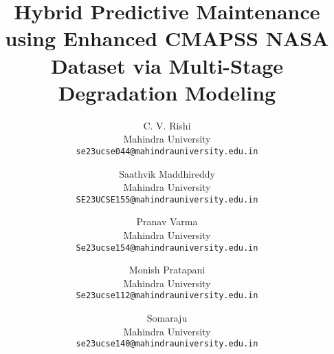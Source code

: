 \documentclass[10pt,twocolumn,letterpaper]{article}
\title{Hybrid Predictive Maintenance using Enhanced CMAPSS NASA Dataset via Multi-Stage Degradation Modeling}
\author{C. V. Rishi\\
        Mahindra University\\
        {\tt\small se23ucse044@mahindrauniversity.edu.in}
        \and
        Saathvik Maddhireddy\\
        Mahindra University\\
        {\tt\small SE23UCSE155@mahindrauniversity.edu.in}
        \and
        Pranav Varma\\
        Mahindra University\\
        {\tt\small Se23ucse154@mahindrauniversity.edu.in}
        \and
        Monish Pratapani\\
        Mahindra University\\
        {\tt\small Se23ucse112@mahindrauniversity.edu.in}
        \and
        Somaraju\\
        Mahindra University\\
        {\tt\small se23ucse140@mahindrauniversity.edu.in}
}
\begin{document}
\maketitle








{
	\small
	
	
}
\end{document}
